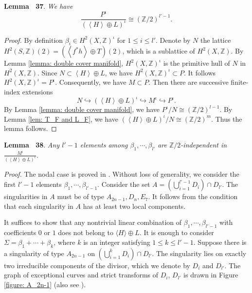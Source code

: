 \documentclass[
]{article}
\begin{document}
\textbf{Lemma~ 37}. \emph{\label{lem: saturation of inv part of P} We
have
\[\frac{P^{\iota}}{(\left\langle H \right\rangle\oplus L)^{\iota}} \cong (\mathbb{Z}/2)^{l'-1}.\]}

\emph{Proof.} By definition \(\beta_i\in H^2(X, \mathbb{Z})^\iota\) for
\(1\le i\le l'\). Denote by \(N\) the lattice
\(H^2(S,\mathbb{Z})(2)=(\left\langle f^*h \right\rangle \oplus T)(2)\),
which is a sublattice of \(H^2(X, \mathbb{Z})\). By Lemma
\ref{lemma: double cover manifold}, \(H^2(X,\mathbb{Z})^{\iota}\) is the
primitive hull of \(N\) in \(H^2(X, \mathbb{Z})\). Since
\(N\subset \left\langle H\right\rangle \oplus L\), we have
\(H^2(X,\mathbb{Z})^{\iota}\subset P\). It follows
\(H^2(X,\mathbb{Z})^{\iota}=P^\iota\). Consequently, we have
\(M\subset P\). Then there are successive finite-index extensions
\[\label{eqn: iota-invariant successive saturations}
    N \hookrightarrow (\left\langle H \right\rangle\oplus L)^{\iota} \hookrightarrow M^{\iota} \hookrightarrow P^{\iota}.\]
By Lemma \ref{lemma: double cover manifold}, we have
\(P^{\iota} / N\cong (\mathbb{Z}/2)^{l-1}\). By Lemma
\ref{lem: T_F and L_F}, we have
\((\left\langle H \right\rangle\oplus L)^{\iota}/N \cong (\mathbb{Z}/2)^{m}\).
Thus the lemma follows.~◻

\textbf{Lemma~ 38}. \emph{\label{lem: Z/2-independence} Any \(l'-1\)
elements among \(\beta_1, \cdots, \beta_{l'}\) are
\(\mathbb{Z}/2\)-independent in
\(\frac{M^{\iota}}{(\left\langle H \right\rangle\oplus L)^{\iota}}\).}

\emph{Proof.} The nodal case is proved in
\cite[Proposition 3.4]{yu2023moduli}. Without loss of generality, we
consider the first \(l'-1\) elements \(\beta_1,\cdots,\beta_{l'-1}\).
Consider the set
\(A=(\mathop\bigcup\limits_{i=1}^{l'-1}D_i)\cap D_{l'}\). The
singularities in \(A\) must be of type \(A_{2n-1}, D_n, E_7\). It
follows from the condition that each singularity in \(A\) has at least
two local components.

It suffices to show that any nontrivial linear combination of
\(\beta_1, \cdots, \beta_{l'-1}\) with coefficients \(0\) or \(1\) does
not belong to \(\langle H\rangle \oplus L\). It is enough to consider
\(\Sigma=\beta_1+\cdots+\beta_k\), where \(k\) is an integer satisfying
\(1\le k\le l'-1\). Suppose there is a singularity of type \(A_{2n-1}\)
on \((\mathop\bigcup\limits_{i=1}^{k} D_i)\cap D_{l'}\). The singularity
lies on exactly two irreducible components of the divisor, which we
denote by \(D_i\) and \(D_{l'}\). The graph of exceptional curves and
strict transforms of \(D_i\), \(D_{l'}\) is drawn in Figure
\ref{figure: A_2n-1} (also see
\cite[Chapter III, \S 7, Table 1]{barth2004compact}).
\end{document}
